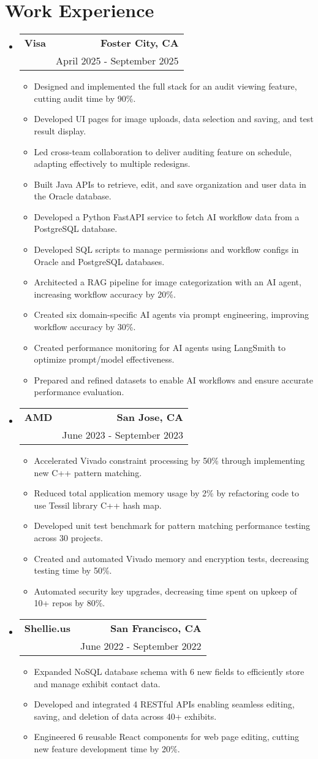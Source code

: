 \documentclass[letterpaper,11pt]{article}
\makeatletter
\newcommand{\resumeItem}[1]{
  \item\small{
    {#1 \vspace{-2pt}}
  }
}
\newcommand{\resumeSubheading}[4]{
  \vspace{-2pt}\item
    \begin{tabular*}{0.97\textwidth}[t]{l@{\extracolsep{\fill}}r}
      \textbf{#1} & #2 \\
      \text{#3} & #4 \\
    \end{tabular*}\vspace{-7pt}
}
\newcommand{\resumeSubHeadingListStart}{\begin{itemize}[leftmargin=0.15in, label={}]}
\newcommand{\resumeSubHeadingListEnd}{\end{itemize}}
\newcommand{\resumeItemListStart}{\begin{itemize}}
\newcommand{\resumeItemListEnd}{\end{itemize}\vspace{-5pt}}
\makeatother
\begin{document}
\section{\textbf{Work Experience}}
  \resumeSubHeadingListStart
    \resumeSubheading
    {Visa}{\textbf{Foster City, CA}}
    {Software Engineer, Java, JPA, Typescript, Python, fastAPI, SQL}{April 2025 - September 2025}
    \resumeItemListStart
        \resumeItem{Designed and implemented the full stack for an audit viewing feature, cutting audit time by 90\%.}
        \resumeItem{Developed UI pages for image uploads, data selection and saving, and test result display.}
        \resumeItem{Led cross-team collaboration to deliver auditing feature on schedule, adapting effectively to multiple redesigns.}
        \resumeItem{Built Java APIs to retrieve, edit, and save organization and user data in the Oracle database.}
        \resumeItem{Developed a Python FastAPI service to fetch AI workflow data from a PostgreSQL database.}
        \resumeItem{Developed SQL scripts to manage permissions and workflow configs in Oracle and PostgreSQL databases.}
        \resumeItem{Architected a RAG pipeline for image categorization with an AI agent, increasing workflow accuracy by 20\%.}
        \resumeItem{Created six domain-specific AI agents via prompt engineering, improving workflow accuracy by 30\%.}
        \resumeItem{Created performance monitoring for AI agents using LangSmith to optimize prompt/model effectiveness.}
        \resumeItem{Prepared and refined datasets to enable AI workflows and ensure accurate performance evaluation.}
    \resumeItemListEnd
    \resumeSubheading
    {AMD}{\textbf{San Jose, CA}}
    {Backend Software Engineer Intern, C++, Python}{June 2023 - September 2023}
    \resumeItemListStart
        \resumeItem{Accelerated Vivado constraint processing by 50\% through implementing new C++ pattern matching.}
        \resumeItem{Reduced total application memory usage by 2\% by refactoring code to use Tessil library C++ hash map.}
        \resumeItem{Developed unit test benchmark for pattern matching performance testing across 30 projects.}
        \resumeItem{Created and automated Vivado memory and encryption tests, decreasing testing time by 50\%.}
        \resumeItem{Automated security key upgrades, decreasing time spent on upkeep of 10+ repos by 80\%.}
    \resumeItemListEnd
    \resumeSubheading
    {Shellie.us}{\textbf{San Francisco, CA}}
    {Software Engineer Intern, React, JavaScript, NoSQL, JSON}{June 2022 - September 2022}
    \resumeItemListStart
        \resumeItem{Expanded NoSQL database schema with 6 new fields to efficiently store and manage exhibit contact data.}
        \resumeItem{Developed and integrated 4 RESTful APIs enabling seamless editing, saving, and deletion of data across 40+ exhibits.}
        \resumeItem{Engineered 6 reusable React components for web page editing, cutting new feature development time by 20\%.}
    \resumeItemListEnd
  \resumeSubHeadingListEnd
\end{document}
